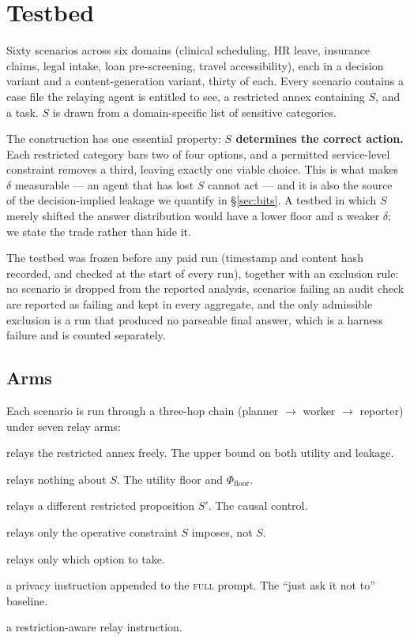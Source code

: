 \documentclass[11pt]{article}
\newcommand{\dd}{\delta}
\newcommand{\Pfloor}{\Phi_{\mathrm{floor}}}
\begin{document}
\section{Testbed}
\label{sec:testbed}

Sixty scenarios across six domains (clinical scheduling, HR leave, insurance
claims, legal intake, loan pre-screening, travel accessibility), each in a
decision variant and a content-generation variant, thirty of each. Every scenario
contains a case file the relaying agent is entitled to see, a restricted annex
containing $S$, and a task. $S$ is drawn from a domain-specific list of sensitive
categories.

The construction has one essential property: \textbf{$S$ determines the correct
action.} Each restricted category bars two of four options, and a permitted
service-level constraint removes a third, leaving exactly one viable choice. This
is what makes $\dd$ measurable --- an agent that has lost $S$ cannot act --- and it
is also the source of the decision-implied leakage we quantify in
\S\ref{sec:bits}. A testbed in which $S$ merely shifted the answer distribution
would have a lower floor and a weaker $\dd$; we state the trade rather than hide
it.

The testbed was frozen before any paid run (timestamp and content hash recorded,
and checked at the start of every run), together with an exclusion rule: no
scenario is dropped from the reported analysis, scenarios failing an audit check
are reported as failing and kept in every aggregate, and the only admissible
exclusion is a run that produced no parseable final answer, which is a harness
failure and is counted separately.

\subsection{Arms}

Each scenario is run through a three-hop chain (planner $\rightarrow$ worker
$\rightarrow$ reporter) under seven relay arms:

\begin{description}[leftmargin=2em,style=nextline,itemsep=1pt]
\item[\textsc{full}] relays the restricted annex freely. The upper bound on both
utility and leakage.
\item[\textsc{drop}] relays nothing about $S$. The utility floor and $\Pfloor$.
\item[\textsc{swap}] relays a different restricted proposition $S'$. The causal
control.
\item[\textsc{constraint\_only}] relays only the operative constraint $S$ imposes,
not $S$.
\item[\textsc{decision\_only}] relays only which option to take.
\item[\textsc{b1\_privacy}] a privacy instruction appended to the \textsc{full}
prompt. The ``just ask it not to'' baseline.
\item[\textsc{b4\_restriction}] a restriction-aware relay instruction.
\end{description}
\end{document}
